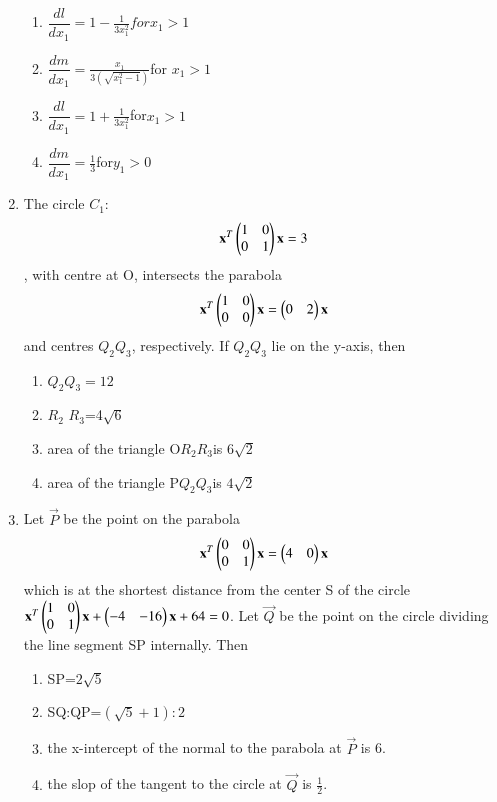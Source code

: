 \begin{enumerate}[label=\arabic*.,ref=\thesubsection.\theenumi]
    \begin{enumerate}
    \item $\dfrac{dl}{dx_1}=1-\frac{1}{3x_1^2}for x_1>1$
    \item $\dfrac{dm}{dx_1}=\frac{x_1}{3(\sqrt{x_1^2-1})}$for $x_1>1$
    \item $\dfrac{dl}{dx_1}=1+\frac{1}{3x_1^2}$for$ x_1>1$
    \item $\dfrac{dm}{dx_1}=\frac{1}{3}$for$y_1>0$
    \end{enumerate}
    \item The circle $C_1$:
    \begin{align}
    \mathbf{x}^T \begin{pmatrix}1& 0 \\0 & 1 \end{pmatrix} \mathbf{x}=3
    \end{align}, with centre at O, intersects the parabola 
    \begin{align}
    \mathbf{x}^T \begin{pmatrix}1& 0 \\0 & 0\end{pmatrix} \mathbf{x}=\begin{pmatrix}0&2\end{pmatrix}\mathbf{x}
    \end{align} and centres $Q_2 Q_3$, respectively. If $Q_2 Q_3$ lie on the y-axis, then
    \begin{enumerate}
    \item $Q_2 Q_3=12$
    \item $R_2$ $R_3$=4$\sqrt{6}$
    \item area of the triangle O$R_2R_3$is $6\sqrt{2}$
    \item area of the triangle P$Q_2Q_3$is $4\sqrt{2}$
    \end{enumerate}
    \item Let $\vec{P}$ be the point on the parabola
    \begin{align}
    \mathbf{x}^T\begin{pmatrix}0&0\\0&1\end{pmatrix}\mathbf{x}=\begin{pmatrix}4&0\end{pmatrix}\mathbf{x}
    \end{align} which is at the shortest distance from the center S of the circle $\mathbf{x}^T\begin{pmatrix}1&0\\0&1\end{pmatrix}\mathbf{x}+\begin{pmatrix}-4&-16\end{pmatrix} \mathbf{x}+64=0$. Let $\vec{Q}$ be the point on the circle dividing the line segment SP internally. Then 
    \begin{enumerate}
    \item SP=$2\sqrt{5}$
    \item SQ:QP=$(\sqrt5+1):2$
    \item the x-intercept of the normal to the parabola at $\vec{P}$ is 6.
    \item the slop of the tangent to the circle at $\vec{Q}$ is $\frac{1}{2}$.
    \end{enumerate}

\end{enumerate}
